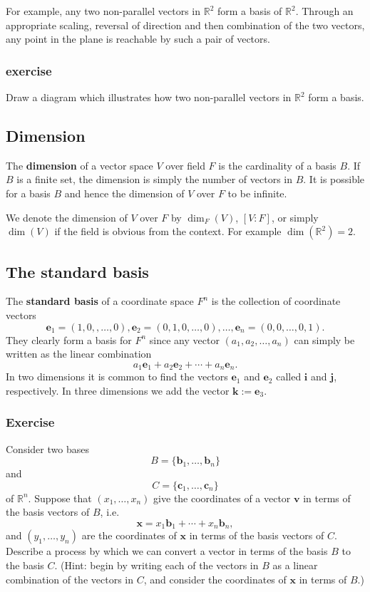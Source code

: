 \documentclass[a4paper,12pt]{amsart}
\begin{document}
    For example, any two non-parallel vectors in $\mathbb{R}^2$ form a basis of $\mathbb{R}^2$. Through an appropriate scaling, reversal of direction and then combination of the two vectors, any point in the plane is reachable by such a pair of vectors.

    \subsubsection{exercise} Draw a diagram which illustrates how two non-parallel vectors in $\mathbb{R}^2$ form a basis.

    \subsection{Dimension} The \textbf{dimension} of a vector space $V$ over field $F$ is the cardinality of a basis $B$. If $B$ is a finite set, the dimension is simply the number of vectors in $B$. It is possible for a basis $B$ and hence the dimension of $V$ over $F$ to be infinite.

    We denote the dimension of $V$ over $F$ by $\dim_F(V)$, $[V : F]$, or simply $\dim(V)$ if the field is obvious from the context. For example $\dim(\mathbb{R}^2) = 2$.

    \subsection{The standard basis}

    The \textbf{standard basis} of a coordinate space $F^n$ is the collection of coordinate vectors 
    \[ \mathbf{e}_1 = (1, 0, , \ldots, 0), \mathbf{e}_2 = (0, 1, 0, \ldots, 0), \ldots, \mathbf{e}_n = (0, 0, \ldots, 0, 1). \]
    They clearly form a basis for $F^n$ since any vector $(a_1, a_2, \ldots, a_n)$ can simply be written as the linear combination
    \[ a_1 \mathbf{e}_1 + a_2 \mathbf{e}_2 + \cdots + a_n \mathbf{e}_n. \]
    In two dimensions it is common to find the vectors $\mathbf{e}_1$ and $\mathbf{e}_2$ called $\mathbf{i}$ and $\mathbf{j}$, respectively. In three dimensions we add the vector $\mathbf{k} := \mathbf{e}_3$.

    \subsubsection{Exercise} Consider two bases 
    \[ B = \{ \mathbf{b}_1, \ldots, \mathbf{b}_n \} \] 
    and 
    \[ C = \{ \mathbf{c}_1, \ldots, \mathbf{c}_n \} \] 
    of $\mathbb{R}^n$. Suppose that $(x_1, \ldots, x_n)$ give the coordinates of a vector $\mathbf{v}$ in terms of the basis vectors of $B$, i.e.
    \[ \mathbf{x} = x_1 \mathbf{b}_1 + \cdots + x_n \mathbf{b}_n, \]
    and $(y_1, \ldots, y_n)$ are the coordinates of $\mathbf{x}$ in terms of the basis vectors of $C$. Describe a process by which we can convert a vector in terms of the basis $B$ to the basis $C$. (Hint: begin by writing each of the vectors in $B$ as a linear combination of the vectors in $C$, and consider the coordinates of $\mathbf{x}$ in terms of $B$.)
\end{document}
